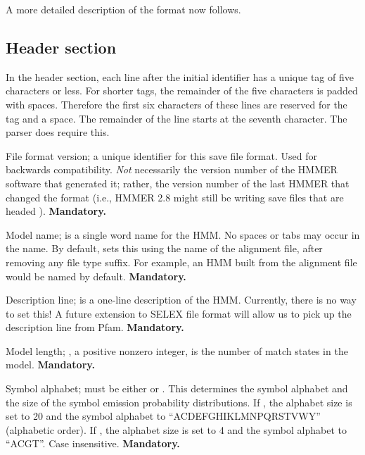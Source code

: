 A more detailed description of the format now follows.

\subsection{Header section}

In the header section, each line after the initial identifier has a
unique tag of five characters or less. For shorter tags, the remainder
of the five characters is padded with spaces. Therefore the first six
characters of these lines are reserved for the tag and a space. The
remainder of the line starts at the seventh character. The parser does
require this.

\begin{wideitem}

\item [\emprog{HMMER2.0}]
File format version; a unique identifier for this save file format. Used for backwards
compatibility. {\em Not} necessarily the version number of the HMMER
software that generated it; rather, the version number of the last
HMMER that changed the format (i.e., HMMER 2.8 might still be writing
save files that are headed ).
\textbf{Mandatory.}

\item [\emprog{NAME  <s>}] Model name;  is a single word name for the HMM.
No spaces or tabs may occur in the name. By default, 
sets this using the name of the alignment file, after removing any
file type suffix. For example, an HMM built from the alignment file
 would be named  by default.
\textbf{Mandatory.}

\item [\emprog{DESC  <s>}] Description line;  is a one-line description 
of the HMM. Currently, there is no way to set this! A future extension
to SELEX file format will allow us to pick up the description line
from Pfam.
\textbf{Mandatory.}

\item [\emprog{LENG  <d>}] Model length; , a positive nonzero integer, 
is the number of match states in the model.
\textbf{Mandatory.}

\item [\emprog{ALPH  <s>}] Symbol alphabet;  must be either
 or . This determines the symbol alphabet and the
size of the symbol emission probability distributions.  If
, the alphabet size is set to 20 and the symbol alphabet
to ``ACDEFGHIKLMNPQRSTVWY'' (alphabetic order). If , the
alphabet size is set to 4 and the symbol alphabet to ``ACGT''.  Case
insensitive. \textbf{Mandatory.}



\end{wideitem}
